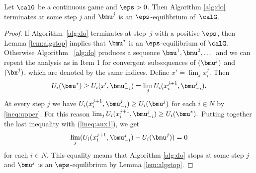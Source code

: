 \begin{theorem}\label{thm:convergence2}
	Let $\calG$ be a continuous game and $\eps>0$. Then Algorithm \ref{alg:do} terminates at some step $j$ and $\bmu^j$ is an $\eps$-equilibrium of~$\calG$.
\end{theorem}
\begin{proof}
	If Algorithm~\ref{alg:do} terminates at step~$j$ with a positive $\eps$, then Lemma \ref{lem:algstop} implies that $\bmu^j$ is an $\eps$-equilibrium of $\calG$. Otherwise Algorithm ~\ref{alg:do} produces a sequence $\bmu^1,\bmu^2,\dots$ and we can repeat the analysis as in Item 1 for  convergent subsequences of $(\bmu^j)$ and $(\bx^j)$, which are denoted by the same indices. Define $x'= \lim_j x_i^j.$ Then
	\begin{equation}\label{ineq:aux1}
	U_i(\bmu^*)\ge U_i(x',\bmu_{-i}^*)= \lim_{j} U_i(x_{i}^{j+1},\bmu_{-i}^j).
	\end{equation}
	At every step $j$ we have $U_i(x_i^{j+1},\bmu^j_{-i})\geq U_i(\bmu^j)$ for each $i\in N$ by \eqref{ineq:upper}. For this reason $\lim_{j} U_i(x_{i}^{j+1},\bmu_{-i}^j) \geq  U_i(\bmu^*).$ Putting together the last inequality with (\ref{ineq:aux1}), we get
	\begin{equation}\label{eq:limiting}
	\lim_{j} (U_i(x_{i}^{j+1},\bmu_{-i}^j)-U_i(\bmu^j)) = 0
	\end{equation}
	for each $i\in N$. This equality means that Algorithm \ref{alg:do} stops at some step $j$ and $\bmu^j$ is an $\eps$-equilibrium by Lemma \ref{lem:algstop}.
\end{proof}

